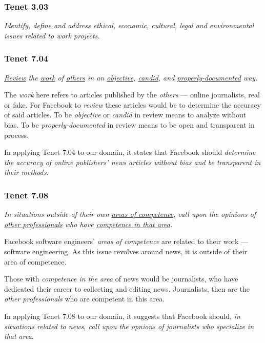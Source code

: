 \subsubsection{Tenet 3.03}

\emph{Identify, define and address ethical, economic, cultural, legal and environmental issues related to work projects. \cite{se_code}}

\subsubsection{Tenet 7.04}

\emph{\underline{Review} the \underline{work} of \underline{others} in an \underline{objective}, \underline{candid}, and \underline{properly-documented} way. \cite{se_code}}

The \emph{work} here refers to articles published by the \emph{others} --- online journalists, real or fake. For Facebook to \emph{review} these articles would be to determine the accuracy of said articles. To be \emph{objective} or \emph{candid} in review means to analyze without bias. To be \emph{properly-documented} in review means to be open and transparent in process. \cite{dictionary}

In applying Tenet 7.04 to our domain, it states that Facebook should \emph{determine the accuracy of online publishers' news articles without bias and be transparent in their methods}.

\subsubsection{Tenet 7.08}

\emph{In situations outside of their own \underline{areas of competence}, call upon the opinions of \underline{other professionals} who have \underline{competence in that area}. \cite{se_code}}

Facebook software engineers' \emph{areas of competence} are related to their work --- software engineering. As this issue revolves around news, it is outside of their area of competence.

Those with \emph{competence in the area} of news would be journalists, who have dedicated their career to collecting and editing news. \cite{dictionary} Journalists, then are the \emph{other professionals} who are competent in this area.

In applying Tenet 7.08 to our domain, it suggests that Facebook should, \emph{in situations related to news, call upon the opnions of journalists who specialize in that area}. 
